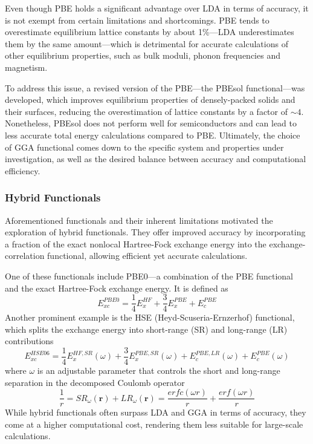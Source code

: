 Even though PBE holds a significant advantage over LDA in terms of accuracy, it is not exempt from certain limitations and shortcomings.  PBE tends to overestimate equilibrium lattice constants by about 1\%---LDA underestimates them by the same amount---which is detrimental for accurate calculations of other equilibrium properties, such as bulk moduli, phonon frequencies and magnetism.

To address this issue, a revised version of the PBE---the PBEsol functional\supercite{Perdew2008}---was developed, which improves equilibrium properties of densely-packed solids and their surfaces, reducing the overestimation of lattice constants by a factor of $\sim 4$. Nonetheless, PBEsol does not perform well for semiconductors and can lead to less accurate total energy calculations compared to PBE.  Ultimately, the choice of GGA functional comes down to the specific system and properties under investigation, as well as the desired balance between accuracy and computational efficiency.

\subsubsection{Hybrid Functionals}
Aforementioned functionals and their inherent limitations motivated the exploration of hybrid functionals. They offer improved accuracy by incorporating a fraction of the exact nonlocal Hartree-Fock exchange energy into the exchange-correlation functional, allowing efficient yet accurate calculations. 

One of these functionals include PBE0\supercite{Heyd2003}---a combination of the PBE functional and the exact Hartree-Fock exchange energy. It is defined as 
\begin{equation}
  \label{eq66}
  E_{xc}^{PBE0} = \frac{1}{4}E_{x}^{HF} + \frac{3}{4}E_{x}^{PBE} + E_{c}^{PBE}
\end{equation}
Another prominent example is the HSE (Heyd-Scuseria-Ernzerhof) functional\supercite{Moussa2012}, which splits the exchange energy into short-range (SR) and long-range (LR) contributions
\begin{equation}
  \label{eq67}
  E_{xc}^{HSE06} = \frac{1}{4}E_{x}^{HF,SR}(\omega) + \frac{3}{4}E_{x}^{PBE,SR}(\omega) + E_{c}^{PBE,LR}(\omega) + E_{c}^{PBE}(\omega)
  \end{equation}
  where $\omega$ is an adjustable parameter that controls the short and long-range separation in the decomposed Coulomb operator
  \begin{equation}
    \label{eq68}
    \frac{1}{r} = SR_{\omega}(\mathbf{r}) + LR_{\omega}(\mathbf{r}) = 
    \frac{erfc(\omega r)}{r} + \frac{erf(\omega r)}{r}
  \end{equation}
  While hybrid functionals often surpass LDA and GGA in terms of accuracy, they come at a higher computational cost, rendering them less suitable for large-scale calculations.  
  
